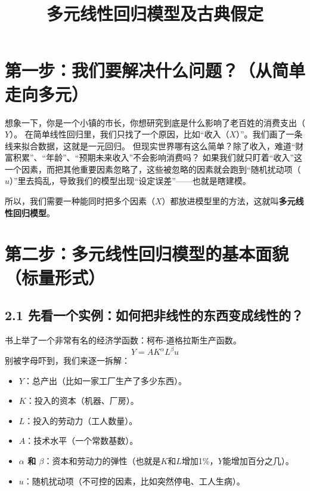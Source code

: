 \documentclass[12pt,a4paper]{ctexart}
\begin{document}
\title{\textbf{多元线性回归模型及古典假定}}
\author{}
\date{}
\maketitle

\section*{第一步：我们要解决什么问题？（从简单走向多元）}

想象一下，你是一个小镇的市长，你想研究到底是什么影响了老百姓的消费支出（\(Y\)）。
在简单线性回归里，我们只找了一个原因，比如“收入（\(X\)）”。我们画了一条线来拟合数据，这就是一元回归。
但现实世界哪有这么简单？除了收入，难道“财富积累”、“年龄”、“预期未来收入”不会影响消费吗？
如果我们就只盯着“收入”这一个因素，而把其他重要因素忽略了，这些被忽略的因素就会跑到“随机扰动项（\(u\)）”里去捣乱，导致我们的模型出现“设定误差”——也就是瞎建模。

所以，我们需要一种能同时把多个因素（\(X\)）都放进模型里的方法，这就叫\textbf{多元线性回归模型}。

\section*{第二步：多元线性回归模型的基本面貌（标量形式）}

\subsection*{2.1 先看一个实例：如何把非线性的东西变成线性的？}
书上举了一个非常有名的经济学函数：柯布-道格拉斯生产函数。
\begin{equation*}
Y = AK^\alpha L^\beta u \tag{3.1}
\end{equation*}
别被字母吓到，我们来逐一拆解：
\begin{itemize}
\item \textbf{\(Y\)}：总产出（比如一家工厂生产了多少东西）。
\item \textbf{\(K\)}：投入的资本（机器、厂房）。
\item \textbf{\(L\)}：投入的劳动力（工人数量）。
\item \textbf{\(A\)}：技术水平（一个常数基数）。
\item \textbf{\(\alpha\) 和 \(\beta\)}：资本和劳动力的弹性（也就是\(K\)和\(L\)增加1\%，\(Y\)能增加百分之几）。
\item \textbf{\(u\)}：随机扰动项（不可控的因素，比如突然停电、工人生病）。
\end{itemize}
\end{document}
